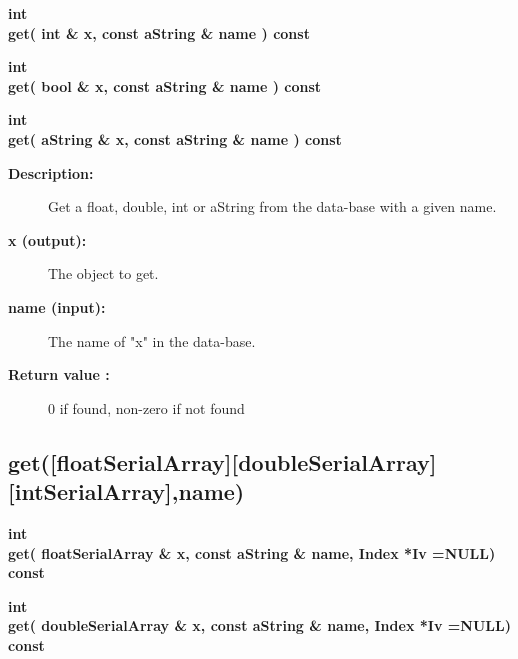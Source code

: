  
\begin{flushleft} \textbf{%
int  \\ 
\settowidth{\GenericDataBaseIncludeArgIndent}{get(}%
get( int \& x, const aString \& name ) const
}\end{flushleft}
    

 
\begin{flushleft} \textbf{%
int  \\ 
\settowidth{\GenericDataBaseIncludeArgIndent}{get(}%
get( bool \& x, const aString \& name ) const
}\end{flushleft}
    

 
\begin{flushleft} \textbf{%
int  \\ 
\settowidth{\GenericDataBaseIncludeArgIndent}{get(}%
get( aString \& x, const aString \& name ) const
}\end{flushleft}
    
\begin{description}
\item[{\bf Description:}]  Get a float, double, int or aString from the data-base with a given name.

\item[{\bf x (output):}]  The object to get.
\item[{\bf name (input):}]  The name of "x" in the data-base.
\item[{\bf Return value :}]  0 if found, non-zero if not found   
\end{description}
\subsection{get([floatSerialArray][doubleSerialArray][intSerialArray],name) }
 
\begin{flushleft} \textbf{%
int  \\ 
\settowidth{\GenericDataBaseIncludeArgIndent}{get(}%
get( floatSerialArray \& x, const aString \& name, Index *Iv  =NULL) const
}\end{flushleft}
    

 
\begin{flushleft} \textbf{%
int  \\ 
\settowidth{\GenericDataBaseIncludeArgIndent}{get(}%
get( doubleSerialArray \& x, const aString \& name, Index *Iv  =NULL) const
}\end{flushleft}
    

